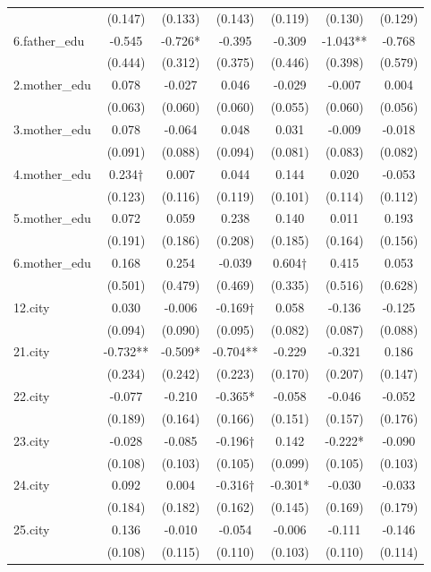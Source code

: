 \documentclass[]{article}
\begin{document}
\begin{tabular}{lcccccc}
 & (0.147) & (0.133) & (0.143) & (0.119) & (0.130) & (0.129) \\
6.father\_edu & -0.545 & -0.726* & -0.395 & -0.309 & -1.043** & -0.768 \\
 & (0.444) & (0.312) & (0.375) & (0.446) & (0.398) & (0.579) \\
2.mother\_edu & 0.078 & -0.027 & 0.046 & -0.029 & -0.007 & 0.004 \\
 & (0.063) & (0.060) & (0.060) & (0.055) & (0.060) & (0.056) \\
3.mother\_edu & 0.078 & -0.064 & 0.048 & 0.031 & -0.009 & -0.018 \\
 & (0.091) & (0.088) & (0.094) & (0.081) & (0.083) & (0.082) \\
4.mother\_edu & 0.234† & 0.007 & 0.044 & 0.144 & 0.020 & -0.053 \\
 & (0.123) & (0.116) & (0.119) & (0.101) & (0.114) & (0.112) \\
5.mother\_edu & 0.072 & 0.059 & 0.238 & 0.140 & 0.011 & 0.193 \\
 & (0.191) & (0.186) & (0.208) & (0.185) & (0.164) & (0.156) \\
6.mother\_edu & 0.168 & 0.254 & -0.039 & 0.604† & 0.415 & 0.053 \\
 & (0.501) & (0.479) & (0.469) & (0.335) & (0.516) & (0.628) \\
12.city & 0.030 & -0.006 & -0.169† & 0.058 & -0.136 & -0.125 \\
 & (0.094) & (0.090) & (0.095) & (0.082) & (0.087) & (0.088) \\
21.city & -0.732** & -0.509* & -0.704** & -0.229 & -0.321 & 0.186 \\
 & (0.234) & (0.242) & (0.223) & (0.170) & (0.207) & (0.147) \\
22.city & -0.077 & -0.210 & -0.365* & -0.058 & -0.046 & -0.052 \\
 & (0.189) & (0.164) & (0.166) & (0.151) & (0.157) & (0.176) \\
23.city & -0.028 & -0.085 & -0.196† & 0.142 & -0.222* & -0.090 \\
 & (0.108) & (0.103) & (0.105) & (0.099) & (0.105) & (0.103) \\
24.city & 0.092 & 0.004 & -0.316† & -0.301* & -0.030 & -0.033 \\
 & (0.184) & (0.182) & (0.162) & (0.145) & (0.169) & (0.179) \\
25.city & 0.136 & -0.010 & -0.054 & -0.006 & -0.111 & -0.146 \\
 & (0.108) & (0.115) & (0.110) & (0.103) & (0.110) & (0.114) \\

\end{tabular}
\end{document}

